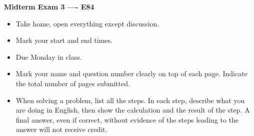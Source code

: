 \usepackage{html}

\begin{center}
{\Large \bf  Midterm Exam 3 ---- E84}
\end{center}

\begin{itemize}
\item Take home, open everything except discussion.
\item Mark your start and end times. %
\item Due Monday in class.
\item Mark your name and question number clearly on top of each page.
	Indicate the total number of pages submitted.
\item When solving a problem, list all the steps. In each step, describe 
	what you are doing in English, then show the calculation and the 
	result of the step. A final answer, even if correct, without 
	evidence of the steps leading to the answer will not receive credit.
\end{itemize}

